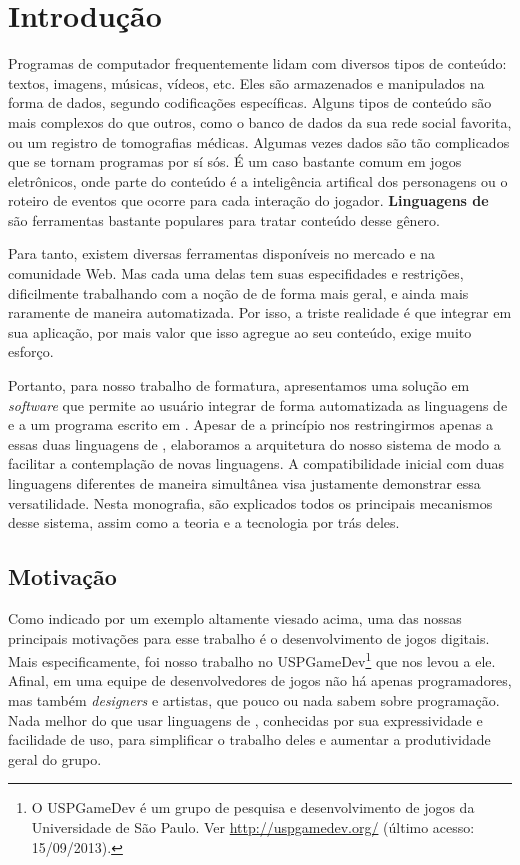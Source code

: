 
\chapter{Introdução}
\label{cap:intr}

Programas de computador frequentemente lidam com diversos tipos de conteúdo:
textos, imagens, músicas, vídeos, etc. Eles são armazenados e manipulados na
forma de dados, segundo codificações específicas. Alguns tipos de conteúdo são
mais complexos do que outros, como o banco de dados da sua rede social favorita,
ou um registro de tomografias médicas. Algumas vezes dados são tão
complicados que se tornam programas por sí sós. É um caso bastante comum em
jogos eletrônicos, onde parte do conteúdo é a inteligência artifical dos
personagens ou o roteiro de eventos que ocorre para cada interação do jogador.
\textbf{Linguagens de \script{}} são ferramentas bastante populares para tratar
conteúdo desse gênero.

Para tanto, existem diversas ferramentas disponíveis no mercado e na comunidade
Web. Mas cada uma delas tem suas especifidades e restrições, dificilmente
trabalhando com a noção de  de forma mais geral, e ainda mais
raramente de maneira automatizada. Por isso, a triste realidade é que integrar
 em sua aplicação, por mais valor que isso agregue ao seu conteúdo,
exige muito esforço.

Portanto, para nosso trabalho de formatura, apresentamos uma solução em
\textit{software} que permite ao usuário integrar de forma automatizada as
linguagens de \script{}  e  a um programa escrito em
\CXX{}. Apesar de a princípio nos restringirmos apenas a essas duas linguagens
de \script{}, elaboramos a arquitetura do nosso sistema de modo a facilitar
a contemplação de novas linguagens. A compatibilidade inicial com duas
linguagens diferentes de maneira simultânea visa justamente demonstrar essa
versatilidade. Nesta monografia, são explicados todos os principais mecanismos desse
sistema, assim como a teoria e a tecnologia por trás deles.

\section{Motivação}
\label{cap:intr:motivacao}

Como indicado por um exemplo altamente viesado acima, uma das nossas principais
motivações para esse trabalho é o desenvolvimento de jogos digitais. Mais
especificamente, foi nosso trabalho no USPGameDev\footnote{
  O USPGameDev é um grupo de pesquisa e desenvolvimento de jogos da
  Universidade de São Paulo. Ver \url{http://uspgamedev.org/}
  (último acesso: 15/09/2013).
} que nos levou a ele. Afinal, em uma equipe de desenvolvedores de jogos não
há apenas programadores, mas também \textit{designers} e artistas, que pouco
ou nada sabem sobre programação. Nada melhor do que usar linguagens de
\script{}, conhecidas por sua expressividade e facilidade de uso, para
simplificar o trabalho deles e aumentar a produtividade geral do grupo.

